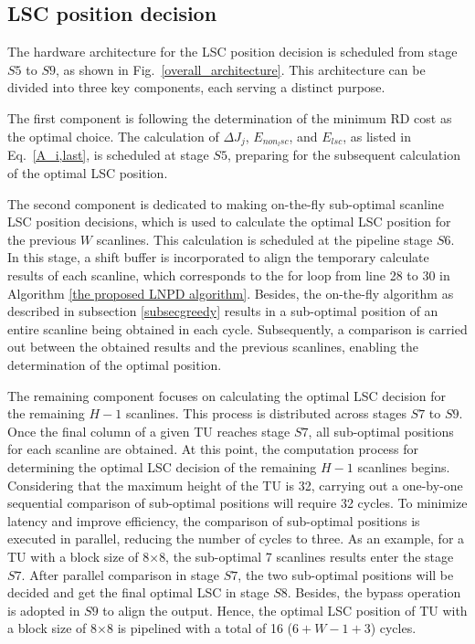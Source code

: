 \documentclass[lettersize,journal]{IEEEtran}
\begin{document}
\subsection{LSC position decision}


The hardware architecture for the LSC position decision is scheduled from stage $S5$ to $S9$, as shown in Fig.~\ref{overall_architecture}. This architecture can be divided into three key components, each serving a distinct purpose. 

The first component is following the determination of the minimum RD cost as the optimal choice. The calculation of $\Delta J_{j}$, $E_{non_lsc}$, and $E_{lsc}$, as listed in Eq.~\eqref{A_i,last}, is scheduled at stage $S5$, preparing for the subsequent calculation of the optimal LSC position. 

The second component is dedicated to making on-the-fly sub-optimal scanline LSC position decisions, which is used to calculate the optimal LSC position for the previous $W$ scanlines. This calculation is scheduled at the pipeline stage $S6$. In this stage, a shift buffer is incorporated to align the temporary calculate results of each scanline, which corresponds to the for loop from line 28 to 30 in Algorithm \ref{the proposed LNPD algorithm}. 
Besides, the on-the-fly algorithm as described in subsection \ref{subsecgreedy} results in a sub-optimal position of an entire scanline being obtained in each cycle. Subsequently, a comparison is carried out between the obtained results and the previous scanlines, enabling the determination of the optimal position. 

The remaining component focuses on calculating the optimal LSC decision for the remaining $H-1$ scanlines. This process is distributed across stages $S7$ to $S9$. 
Once the final column of a given TU reaches stage $S7$, all sub-optimal positions for each scanline are obtained. 
At this point, the computation process for determining the optimal LSC decision of the remaining $H-1$ scanlines begins. 
Considering that the maximum height of the TU is 32, carrying out a one-by-one sequential comparison of sub-optimal positions will require 32 cycles. 
To minimize latency and improve efficiency, the comparison of sub-optimal positions is executed in parallel, reducing the number of cycles to three. 
As an example, for a TU with a block size of 8$\times$8, the sub-optimal 7 scanlines results enter the stage $S7$. After parallel comparison in stage $S7$, the two sub-optimal positions will be decided and get the final optimal LSC in stage $S8$. Besides, the bypass operation is adopted in $S9$ to align the output. Hence, the optimal LSC position of TU with a block size of 8$\times$8 is pipelined with a total of 16 ($6 + W - 1 + 3$) cycles. 
\end{document}
